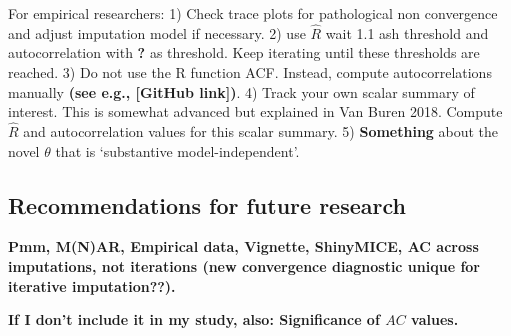 \documentclass[Royal,times,sageh]{sagej}
\begin{document}
For empirical researchers: 1) Check trace plots for pathological non
convergence and adjust imputation model if necessary. 2) use
\(\widehat{R}\) wait 1.1 ash threshold and autocorrelation with
\textbf{?} as threshold. Keep iterating until these thresholds are
reached. 3) Do not use the R function ACF. Instead, compute
autocorrelations manually \textbf{(see e.g., {[}GitHub link{]})}. 4)
Track your own scalar summary of interest. This is somewhat advanced but
explained in Van Buren 2018. Compute \(\widehat{R}\) and autocorrelation
values for this scalar summary. 5) \textbf{Something} about the novel
\(\theta\) that is `substantive model-independent'.

\hypertarget{recommendations-for-future-research}{%
\subsection{Recommendations for future
research}\label{recommendations-for-future-research}}

\textbf{Pmm, M(N)AR, Empirical data, Vignette, ShinyMICE, AC across
imputations, not iterations (new convergence diagnostic unique for
iterative imputation??).}

\textbf{If I don't include it in my study, also: Significance of \(AC\)
values.}



\end{document}
